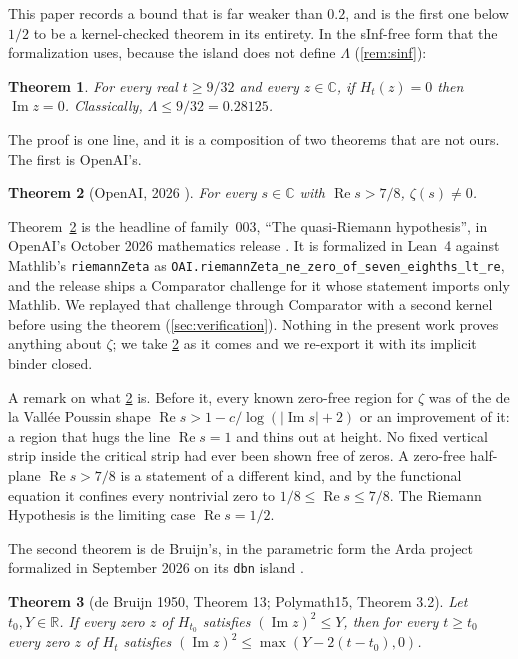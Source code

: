 \documentclass[11pt]{article}
\newtheorem{theorem}{Theorem}
\theoremstyle{definition}
\newcommand{\lean}[1]{\texttt{#1}}
\newcommand{\Lam}{\Lambda}
\newcommand{\Hfun}{H}
\newcommand{\re}{\operatorname{Re}}
\newcommand{\im}{\operatorname{Im}}
\newcommand{\C}{\mathbb{C}}
\newcommand{\R}{\mathbb{R}}
\begin{document}
This paper records a bound that is far weaker than $0.2$, and is the first one below $1/2$ to be a kernel-checked theorem in its entirety. In the sInf-free form that the formalization uses, because the island does not define $\Lam$ (\cref{rem:sinf}):

\begin{theorem}\label{thm:main}
For every real $t \ge 9/32$ and every $z \in \C$, if $\Hfun_t(z) = 0$ then $\im z = 0$. Classically, $\Lam \le 9/32 = 0.28125$.
\end{theorem}

The proof is one line, and it is a composition of two theorems that are not ours. The first is OpenAI's.

\begin{theorem}[OpenAI, 2026 \cite{OAIqrh,OAImath}]\label{thm:qrh}
For every $s \in \C$ with $\re s > 7/8$, $\zeta(s) \ne 0$.
\end{theorem}

Theorem~\ref{thm:qrh} is the headline of family~003, ``The quasi-Riemann hypothesis'', in OpenAI's October 2026 mathematics release \cite{OAImath}. It is formalized in Lean~4 against Mathlib's \lean{riemannZeta} as \lean{OAI.riemannZeta\_ne\_zero\_of\_seven\_eighths\_lt\_re}, and the release ships a Comparator challenge for it whose statement imports only Mathlib. We replayed that challenge through Comparator with a second kernel before using the theorem (\cref{sec:verification}). Nothing in the present work proves anything about $\zeta$; we take \cref{thm:qrh} as it comes and we re-export it with its implicit binder closed.

A remark on what \cref{thm:qrh} is. Before it, every known zero-free region for $\zeta$ was of the de la Vall\'ee Poussin shape $\re s > 1 - c/\log(|{\im s}| + 2)$ or an improvement of it: a region that hugs the line $\re s = 1$ and thins out at height. No fixed vertical strip inside the critical strip had ever been shown free of zeros. A zero-free half-plane $\re s > 7/8$ is a statement of a different kind, and by the functional equation it confines every nontrivial zero to $1/8 \le \re s \le 7/8$. The Riemann Hypothesis is the limiting case $\re s = 1/2$.

The second theorem is de Bruijn's, in the parametric form the Arda project formalized in September 2026 on its \lean{dbn} island \cite{Arda}.

\begin{theorem}[de Bruijn 1950, Theorem 13; Polymath15, Theorem 3.2]\label{thm:dB}
Let $t_0, Y \in \R$. If every zero $z$ of $\Hfun_{t_0}$ satisfies $(\im z)^2 \le Y$, then for every $t \ge t_0$ every zero $z$ of $\Hfun_t$ satisfies $(\im z)^2 \le \max(Y - 2(t - t_0), 0)$.
\end{theorem}
\end{document}

